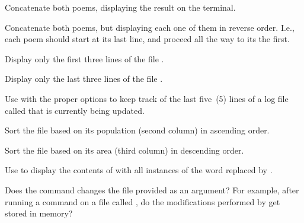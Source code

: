 \begin{exercises}
  \item Concatenate both poems, displaying the result on the terminal.
  \item Concatenate both poems, but displaying each one of them in reverse order. I.e., each poem should start at its last line, and proceed all the way to its the first.
  \item Display only the first three lines of the file .
  \item Display only the last three lines of the file .
  \item Use  with the proper options to keep track of the last five~(5) lines of a log file called  that is currently being updated.
  \item Sort the  file based on its population (second column) in ascending order.
  \item Sort the  file based on its area (third column) in descending order.
  \item Use  to display the contents of  with all instances of the word  replaced by .
  \item Does the  command changes the file provided as an argument? For example, after running a  command on a file called , do the modifications performed by  get stored in memory?
\end{exercises}
